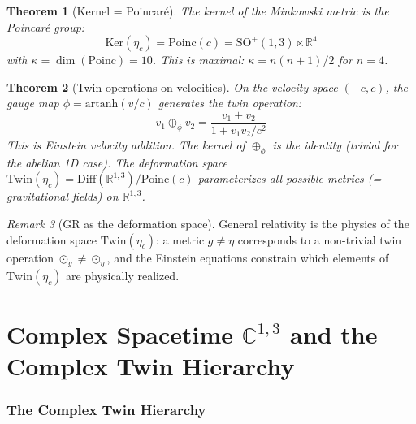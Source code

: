 \documentclass[12pt]{article}
\theoremstyle{plain}
\newtheorem{theorem}{Theorem}[section]
\theoremstyle{definition}
\theoremstyle{remark}
\newtheorem{remark}[theorem]{Remark}
\newcommand{\Ker}{\mathrm{Ker}}
\newcommand{\Twin}{\mathrm{Twin}}
\newcommand{\Poinc}{\mathrm{Poinc}}
\newcommand{\Diff}{\mathrm{Diff}}
\newcommand{\SO}{\mathrm{SO}}
\newcommand{\CC}{\mathbb{C}}
\newcommand{\RR}{\mathbb{R}}
\begin{document}
\begin{theorem}[Kernel = Poincar\'e]\label{thm:poincare-kernel}
The kernel of the Minkowski metric is the Poincar\'e group:
\begin{equation}
\Ker(\eta_c) = \Poinc(c) = \SO^+(1,3) \ltimes \RR^4
\end{equation}
with $\kappa = \dim(\Poinc) = 10$. This is maximal: $\kappa = n(n+1)/2$ for $n = 4$.
\end{theorem}

\begin{theorem}[Twin operations on velocities]\label{thm:velocity-twin}
On the velocity space $(-c, c)$, the gauge map $\phi = \mathrm{artanh}(v/c)$ generates the twin operation:
\begin{equation}
v_1 \oplus_\phi v_2 = \frac{v_1 + v_2}{1 + v_1v_2/c^2}
\end{equation}
This is Einstein velocity addition. The kernel of $\oplus_\phi$ is the identity (trivial for the abelian 1D case). The deformation space $\Twin(\eta_c) = \Diff(\RR^{1,3})/\Poinc(c)$ parameterizes all possible metrics (= gravitational fields) on $\RR^{1,3}$.
\end{theorem}

\begin{remark}[GR as the deformation space]
General relativity is the physics of the deformation space $\Twin(\eta_c)$: a metric $g \neq \eta$ corresponds to a non-trivial twin operation $\odot_g \neq \odot_\eta$, and the Einstein equations constrain which elements of $\Twin(\eta_c)$ are physically realized.
\end{remark}



\part{Complex Spacetime $\CC^{1,3}$ and the Complex Twin Hierarchy}

\section{The Complex Twin Hierarchy}
\label{sec:complex-hierarchy}
\end{document}

